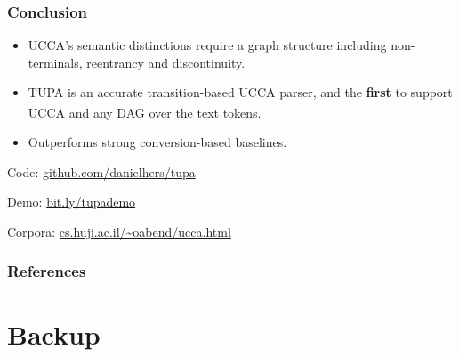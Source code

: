 \documentclass[t]{beamer}
\newcommand{\parser}[1]{TUPA\textsubscript{#1}}
\begin{document}
\begin{frame}
\frametitle{Conclusion}
\begin{itemize}
 \item UCCA's semantic distinctions require a graph structure including {\color{blue}non-terminals}, {\color{orange}reentrancy} and {\color{red}discontinuity}.
 \item \parser{} is an accurate transition-based UCCA parser,
 	and the \textbf{first} to support UCCA and any DAG over the text tokens.
 \item Outperforms strong conversion-based baselines.
\end{itemize}


\vfill
Code: \url{github.com/danielhers/tupa}

Demo: \url{bit.ly/tupademo}

Corpora: \url{cs.huji.ac.il/~oabend/ucca.html}

\end{frame}



\begin{frame}[allowframebreaks]
\frametitle{References}

\tiny
\end{frame}


\section{Backup}
\end{document}
